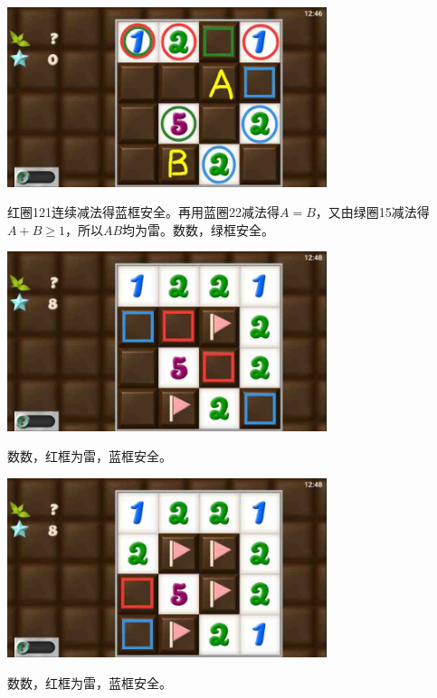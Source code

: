\subsection{} %
\begin{center}
    \includegraphics[width=0.7\textwidth]{puzzlelow/88-1.jpg}
\end{center}
红圈121连续减法得蓝框安全。再用蓝圈22减法得$A=B$，又由绿圈15减法得$A+B\ge 1$，所以$AB$均为雷。数数，绿框安全。
\begin{center}
    \includegraphics[width=0.7\textwidth]{puzzlelow/88-2.jpg}
\end{center}
数数，红框为雷，蓝框安全。
\begin{center}
    \includegraphics[width=0.7\textwidth]{puzzlelow/88-3.jpg}
\end{center}
数数，红框为雷，蓝框安全。

